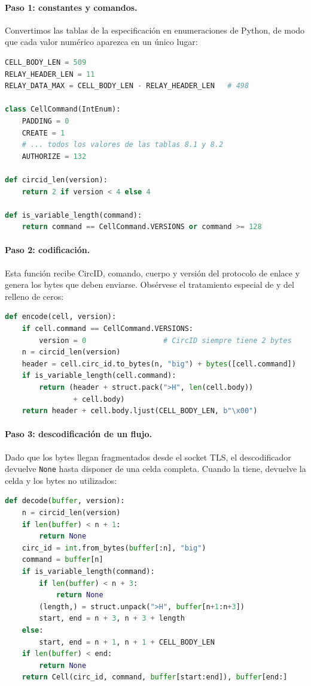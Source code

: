 \paragraph{Paso 1: constantes y comandos.} Convertimos las tablas de la especificación en enumeraciones de Python, de modo que cada valor numérico aparezca en un único lugar:

\begin{lstlisting}[language=Python]
CELL_BODY_LEN = 509
RELAY_HEADER_LEN = 11
RELAY_DATA_MAX = CELL_BODY_LEN - RELAY_HEADER_LEN   # 498

class CellCommand(IntEnum):
    PADDING = 0
    CREATE = 1
    # ... todos los valores de las tablas 8.1 y 8.2
    AUTHORIZE = 132

def circid_len(version):
    return 2 if version < 4 else 4

def is_variable_length(command):
    return command == CellCommand.VERSIONS or command >= 128
\end{lstlisting}

\paragraph{Paso 2: codificación.} Esta función recibe CircID, comando, cuerpo y versión del protocolo de enlace y genera los bytes que deben enviarse. Obsérvese el tratamiento especial de  y del relleno de ceros:

\begin{lstlisting}[language=Python]
def encode(cell, version):
    if cell.command == CellCommand.VERSIONS:
        version = 0                  # CircID siempre tiene 2 bytes
    n = circid_len(version)
    header = cell.circ_id.to_bytes(n, "big") + bytes([cell.command])
    if is_variable_length(cell.command):
        return (header + struct.pack(">H", len(cell.body))
                + cell.body)
    return header + cell.body.ljust(CELL_BODY_LEN, b"\x00")
\end{lstlisting}

\paragraph{Paso 3: descodificación de un flujo.} Dado que los bytes llegan fragmentados desde el socket TLS, el descodificador devuelve \texttt{None} hasta disponer de una celda completa. Cuando la tiene, devuelve la celda y los bytes no utilizados:

\begin{lstlisting}[language=Python]
def decode(buffer, version):
    n = circid_len(version)
    if len(buffer) < n + 1:
        return None
    circ_id = int.from_bytes(buffer[:n], "big")
    command = buffer[n]
    if is_variable_length(command):
        if len(buffer) < n + 3:
            return None
        (length,) = struct.unpack(">H", buffer[n+1:n+3])
        start, end = n + 3, n + 3 + length
    else:
        start, end = n + 1, n + 1 + CELL_BODY_LEN
    if len(buffer) < end:
        return None
    return Cell(circ_id, command, buffer[start:end]), buffer[end:]
\end{lstlisting}

